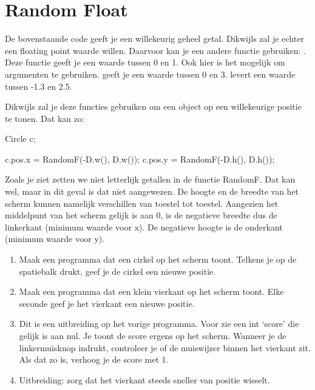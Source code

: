 \section{Random Float}
De bovenstaande code geeft je een willekeurig geheel getal. Dikwijls zal je echter een floating point waarde willen. Daarvoor kan je een andere functie gebruiken: . Deze functie geeft je een waarde tussen 0 en 1. Ook hier is het mogelijk om argumenten te gebruiken.  geeft je een waarde tussen 0 en 3.  levert een waarde tussen -1.3 en 2.5.

Dikwijls zal je deze functies gebruiken om een object op een willekeurige positie te tonen. Dat kan zo:

\begin{code}
Circle c;

c.pos.x = RandomF(-D.w(), D.w());
c.pos.y = RandomF(-D.h(), D.h());
\end{code}

Zoals je ziet zetten we niet letterlijk getallen in de functie RandomF. Dat kan wel, maar in dit geval is dat niet aangewezen. De hoogte en de breedte van het scherm kunnen namelijk verschillen van toestel tot toestel. Aangezien het middelpunt van het scherm gelijk is aan 0, is de negatieve breedte dus de linkerkant (minimum waarde voor x). De negatieve hoogte is de onderkant (minimum waarde voor y).

\begin{exercise}
\begin{enumerate}
\item Maak een programma dat een cirkel op het scherm toont. Telkens je op de spatiebalk drukt, geef je de cirkel een nieuwe positie.
\item Maak een programma dat een klein vierkant op het scherm toont. Elke seconde geef je het vierkant een nieuwe positie.
\item Dit is een uitbreiding op het vorige programma. Voor zie een int `score' die gelijk is aan nul. Je toont de score ergens op het scherm. Wanneer je de linkermuisknop indrukt, controleer je of de muiswijzer binnen het vierkant zit. Als dat zo is, verhoog je de score met 1.
\item Uitbreiding: zorg dat het vierkant steeds sneller van positie wisselt.
\end{enumerate}  
\end{exercise}




